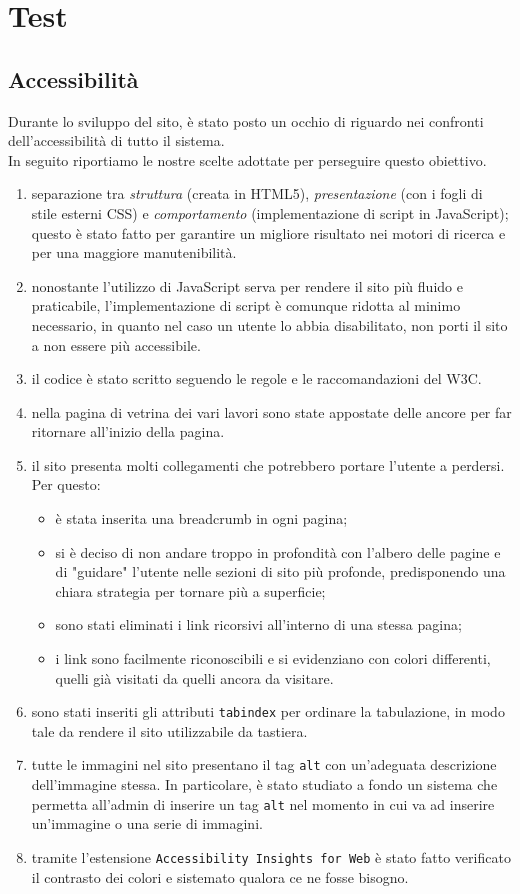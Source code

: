 \section{Test}
\subsection{Accessibilità}
Durante lo sviluppo del sito, è stato posto un occhio di riguardo nei confronti dell'accessibilità di tutto il sistema.\\In seguito riportiamo le nostre scelte adottate per perseguire questo obiettivo.
\begin{enumerate}
	\item separazione tra \textit{struttura} (creata in HTML5), \textit{presentazione} (con i fogli di stile esterni CSS) e \textit{comportamento} (implementazione di script in JavaScript); \\questo è stato fatto per garantire un migliore risultato nei motori di ricerca e per una maggiore manutenibilità.
	
	\item nonostante l'utilizzo di JavaScript serva per rendere il sito più fluido e praticabile, l'implementazione di script è comunque ridotta al minimo necessario, in quanto nel caso un utente lo abbia disabilitato, non porti il sito a non essere più accessibile.
	\item il codice è stato scritto seguendo le regole e le raccomandazioni del W3C.
	\item nella pagina di vetrina dei vari lavori sono state appostate delle ancore per far ritornare all'inizio della pagina.
	\item il sito presenta molti collegamenti che potrebbero portare l'utente a perdersi. Per questo: 
	\begin{itemize}
	\item è stata inserita una breadcrumb in ogni pagina;
	\item si è deciso di non andare troppo in profondità con l'albero delle pagine e di "guidare" l'utente nelle sezioni di sito più profonde, predisponendo una chiara strategia per tornare più a superficie;
	\item sono stati eliminati i link ricorsivi all'interno di una stessa pagina;
	\item i link sono facilmente riconoscibili e si evidenziano con colori differenti, quelli già visitati da quelli ancora da visitare.
	\end{itemize}	
	\item sono stati inseriti gli attributi \texttt{tabindex} per ordinare la tabulazione, in modo tale da rendere il sito utilizzabile da tastiera.
	\item tutte le immagini nel sito presentano il tag \texttt{alt} con un'adeguata descrizione dell'immagine stessa. In particolare, è stato studiato a fondo un sistema che permetta all'admin di inserire un tag \texttt{alt} nel momento in cui va ad inserire un'immagine o una serie di immagini.
	\item tramite l'estensione \texttt{Accessibility Insights for Web} è stato fatto verificato il contrasto dei colori e sistemato qualora ce ne fosse bisogno.
\end{enumerate}
